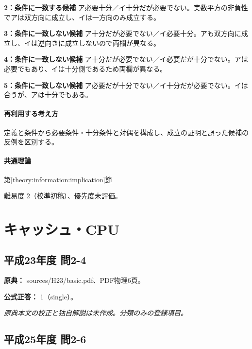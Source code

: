 \noindent\textbf{2：条件に一致する候補} ア必要十分／イ十分だが必要でない。実数平方の非負性でアは双方向に成立し、イは一方向のみ成立する。\par

\noindent\textbf{3：条件に一致しない候補} ア十分だが必要でない／イ必要十分。アも双方向に成立し、イは逆向きに成立しないので両欄が異なる。\par

\noindent\textbf{4：条件に一致しない候補} ア十分だが必要でない／イ必要だが十分でない。アは必要でもあり、イは十分側であるため両欄が異なる。\par

\noindent\textbf{5：条件に一致しない候補} ア必要だが十分でない／イ十分だが必要でない。イは合うが、アは十分でもある。\par

\paragraph{再利用する考え方} 定義と条件から必要条件・十分条件と対偶を構成し、成立の証明と誤った候補の反例を区別する。

\paragraph{共通理論} \hyperref[theory:information:implication]{第\ref*{theory:information:implication}節}

\par 難易度 2（校準初稿）、優先度未評価。

\section{キャッシュ・CPU}

\subsection{平成23年度 問2-4}
\label{q:h23-reg-basic-2-4}

\noindent\textbf{原典：} sources/H23/basic.pdf、PDF物理6頁。

\textbf{公式正答：} 1（single）。

\par\textit{原典本文の校正と独自解説は未作成。分類のみの登録項目。}

\subsection{平成25年度 問2-6}
\label{q:h25-reg-basic-2-6}

